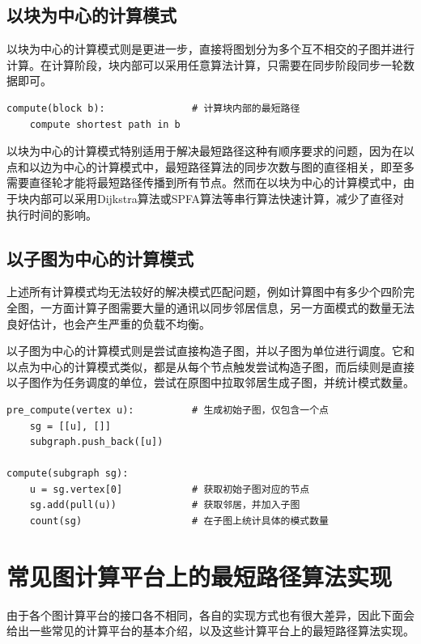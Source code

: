 \subsection{以块为中心的计算模式}

以块为中心的计算模式则是更进一步，直接将图划分为多个互不相交的子图并进行计算。在计算阶段，块内部可以采用任意算法计算，只需要在同步阶段同步一轮数据即可。
\begin{lstlisting}
compute(block b):               # 计算块内部的最短路径
    compute shortest path in b
\end{lstlisting}

以块为中心的计算模式特别适用于解决最短路径这种有顺序要求的问题，因为在以点和以边为中心的计算模式中，最短路径算法的同步次数与图的直径相关，即至多需要直径轮才能将最短路径传播到所有节点。然而在以块为中心的计算模式中，由于块内部可以采用Dijkstra算法或SPFA算法等串行算法快速计算，减少了直径对执行时间的影响。

\subsection{以子图为中心的计算模式}

上述所有计算模式均无法较好的解决模式匹配问题，例如计算图中有多少个四阶完全图，一方面计算子图需要大量的通讯以同步邻居信息，另一方面模式的数量无法良好估计，也会产生严重的负载不均衡。

以子图为中心的计算模式则是尝试直接构造子图，并以子图为单位进行调度。它和以点为中心的计算模式类似，都是从每个节点触发尝试构造子图，而后续则是直接以子图作为任务调度的单位，尝试在原图中拉取邻居生成子图，并统计模式数量。
\begin{lstlisting}
pre_compute(vertex u):          # 生成初始子图，仅包含一个点
    sg = [[u], []]
    subgraph.push_back([u])

compute(subgraph sg):
    u = sg.vertex[0]            # 获取初始子图对应的节点
    sg.add(pull(u))             # 获取邻居，并加入子图
    count(sg)                   # 在子图上统计具体的模式数量
\end{lstlisting}



\section{常见图计算平台上的最短路径算法实现}

由于各个图计算平台的接口各不相同，各自的实现方式也有很大差异，因此下面会给出一些常见的计算平台的基本介绍，以及这些计算平台上的最短路径算法实现。

